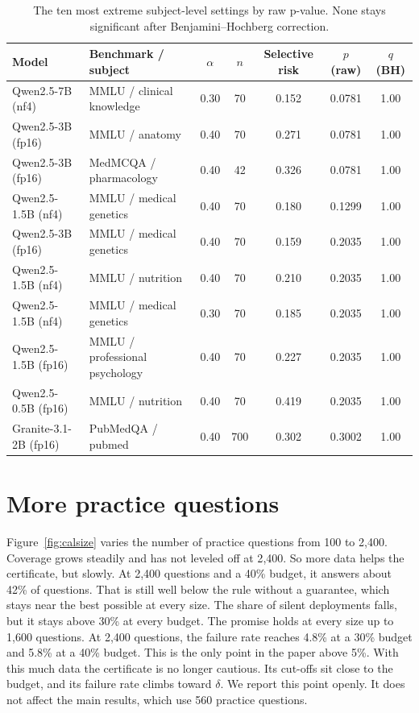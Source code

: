 \documentclass[11pt]{article}
\theoremstyle{plain}
\theoremstyle{definition}
\begin{document}
\begin{table}[H]
\centering
\small
\caption{The ten most extreme subject-level settings by raw p-value. None stays significant after Benjamini--Hochberg correction.}
\label{tab:strata}
\begin{tabular}{llccccc}
\toprule
Model & Benchmark / subject & $\alpha$ & $n$ & Selective risk & $p$ (raw) & $q$ (BH) \\
\midrule
Qwen2.5-7B (nf4) & MMLU / clinical knowledge & 0.30 & 70 & 0.152 & 0.0781 & 1.00 \\
Qwen2.5-3B (fp16) & MMLU / anatomy & 0.40 & 70 & 0.271 & 0.0781 & 1.00 \\
Qwen2.5-3B (fp16) & MedMCQA / pharmacology & 0.40 & 42 & 0.326 & 0.0781 & 1.00 \\
Qwen2.5-1.5B (nf4) & MMLU / medical genetics & 0.40 & 70 & 0.180 & 0.1299 & 1.00 \\
Qwen2.5-3B (fp16) & MMLU / medical genetics & 0.40 & 70 & 0.159 & 0.2035 & 1.00 \\
Qwen2.5-1.5B (nf4) & MMLU / nutrition & 0.40 & 70 & 0.210 & 0.2035 & 1.00 \\
Qwen2.5-1.5B (nf4) & MMLU / medical genetics & 0.30 & 70 & 0.185 & 0.2035 & 1.00 \\
Qwen2.5-1.5B (fp16) & MMLU / professional psychology & 0.40 & 70 & 0.227 & 0.2035 & 1.00 \\
Qwen2.5-0.5B (fp16) & MMLU / nutrition & 0.40 & 70 & 0.419 & 0.2035 & 1.00 \\
Granite-3.1-2B (fp16) & PubMedQA / pubmed & 0.40 & 700 & 0.302 & 0.3002 & 1.00 \\
\bottomrule
\end{tabular}
\end{table}

\section{More practice questions}
\label{app:calsize}

Figure~\ref{fig:calsize} varies the number of practice questions from 100 to 2{,}400. Coverage grows steadily and has not leveled off at 2{,}400. So more data helps the certificate, but slowly. At 2{,}400 questions and a 40\% budget, it answers about 42\% of questions. That is still well below the rule without a guarantee, which stays near the best possible at every size. The share of silent deployments falls, but it stays above 30\% at every budget. The promise holds at every size up to 1{,}600 questions. At 2{,}400 questions, the failure rate reaches 4.8\% at a 30\% budget and 5.8\% at a 40\% budget. This is the only point in the paper above 5\%. With this much data the certificate is no longer cautious. Its cut-offs sit close to the budget, and its failure rate climbs toward $\delta$. We report this point openly. It does not affect the main results, which use 560 practice questions.
\end{document}
